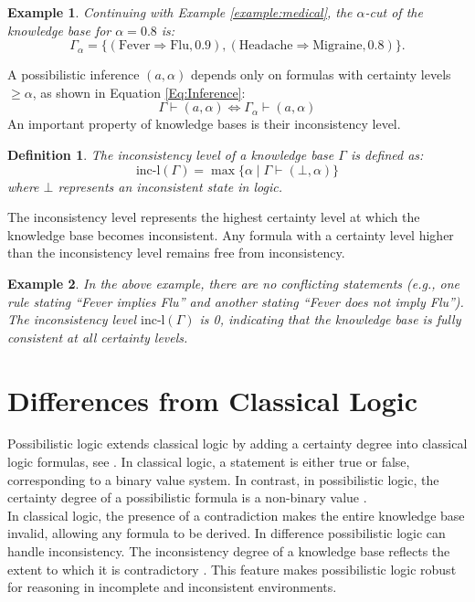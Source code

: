 \documentclass[seminar,english,m]{AIGpaper}
\newtheorem{definition}{Definition}
\newtheorem{example}{Example}
\begin{document}
\begin{example}  
	Continuing with Example \ref{example:medical}, the \( \alpha \)-cut of the knowledge base for \( \alpha = 0.8 \) is:  
	\[
	\Gamma_\alpha = \{ (\text{Fever} \Rightarrow \text{Flu}, 0.9), (\text{Headache} \Rightarrow \text{Migraine}, 0.8) \}.
	\]
\end{example}
A possibilistic inference \( (a, \alpha) \) depends only on formulas with certainty levels \( \geq \alpha \), as shown in Equation \ref{Eq:Inference}:
\begin{equation}\label{Eq:Inference}  
	\Gamma \vdash (a, \alpha) \iff \Gamma_\alpha \vdash (a, \alpha)  
\end{equation}
An important property of knowledge bases is their inconsistency level.
\begin{definition}  
	The inconsistency level of a knowledge base \( \Gamma \) is defined as:  
	\begin{equation}\label{Eq:Inconsistency_level}  
		\text{inc-l}(\Gamma) = \max\{\alpha \mid \Gamma \vdash (\bot, \alpha)\}  
	\end{equation}  
	where \( \bot \) represents an inconsistent state in logic.  
\end{definition}
The inconsistency level represents the highest certainty level at which the knowledge base becomes inconsistent. Any formula with a certainty level higher than the inconsistency level remains free from inconsistency.
\begin{example}  
	In the above example, there are no conflicting statements (e.g., one rule stating “Fever implies Flu” and another stating “Fever does not imply Flu”). The inconsistency level \( \text{inc-l}(\Gamma) \) is 0, indicating that the knowledge base is fully consistent at all certainty levels.  
\end{example}
\section{Differences from Classical Logic} \label{DifferencesClassical}  
Possibilistic logic extends classical logic by adding a certainty degree into classical logic formulas, see \cite{dubois2014possibilistic}. In classical logic, a statement is either true or false, corresponding to a binary value system. In contrast, in possibilistic logic, the certainty degree of a possibilistic formula is a non-binary value \cite{dubois1991}. \\
In classical logic, the presence of a contradiction makes the entire knowledge base invalid, allowing any formula to be derived. In difference possibilistic logic can handle inconsistency. The inconsistency degree of a knowledge base reflects the extent to which it is contradictory \cite{dubois2014possibilistic}. This feature makes possibilistic logic robust for reasoning in incomplete and inconsistent environments.
\end{document}
